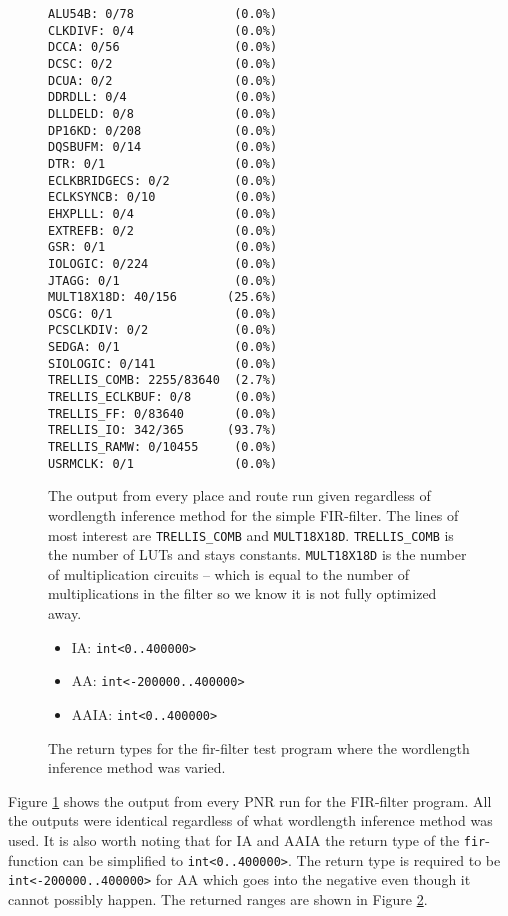 \begin{figure}[h!]
\begin{center}
\begin{verbatim}
ALU54B: 0/78              (0.0%)
CLKDIVF: 0/4              (0.0%)
DCCA: 0/56                (0.0%)
DCSC: 0/2                 (0.0%)
DCUA: 0/2                 (0.0%)
DDRDLL: 0/4               (0.0%)
DLLDELD: 0/8              (0.0%)
DP16KD: 0/208             (0.0%)
DQSBUFM: 0/14             (0.0%)
DTR: 0/1                  (0.0%)
ECLKBRIDGECS: 0/2         (0.0%)
ECLKSYNCB: 0/10           (0.0%)
EHXPLLL: 0/4              (0.0%)
EXTREFB: 0/2              (0.0%)
GSR: 0/1                  (0.0%)
IOLOGIC: 0/224            (0.0%)
JTAGG: 0/1                (0.0%)
MULT18X18D: 40/156       (25.6%)
OSCG: 0/1                 (0.0%)
PCSCLKDIV: 0/2            (0.0%)
SEDGA: 0/1                (0.0%)
SIOLOGIC: 0/141           (0.0%)
TRELLIS_COMB: 2255/83640  (2.7%)
TRELLIS_ECLKBUF: 0/8      (0.0%)
TRELLIS_FF: 0/83640       (0.0%)
TRELLIS_IO: 342/365      (93.7%)
TRELLIS_RAMW: 0/10455     (0.0%)
USRMCLK: 0/1              (0.0%)
\end{verbatim}
\end{center}

  \cprotect\caption{The output from every place and route run given regardless of wordlength inference method for the simple FIR-filter. The lines of most interest are \verb+TRELLIS_COMB+ and \verb+MULT18X18D+. \verb+TRELLIS_COMB+ is the number of LUTs and stays constants. \verb+MULT18X18D+ is the number of multiplication circuits -- which is equal to the number of multiplications in the filter so we know it is not fully optimized away.}
  \label{fig:FIRoutput}
\end{figure}

\begin{figure}[h!]
\begin{itemize}
  \item IA: \verb+int<0..400000>+
  \item AA: \verb+int<-200000..400000>+
  \item AAIA: \verb+int<0..400000>+
\end{itemize}
  \caption{The return types for the fir-filter test program where the wordlength inference method was varied.}
  \label{figRangeRes}
\end{figure}

Figure \ref{fig:FIRoutput} shows the output from every PNR run for the FIR-filter program. All the outputs were identical regardless of what wordlength inference method was used. It is also worth noting that for IA and AAIA the return type of the \verb+fir+-function can be simplified to \verb+int<0..400000>+. The return type is required to be \verb+int<-200000..400000>+ for AA which goes into the negative even though it cannot possibly happen. The returned ranges are shown in Figure \ref{figRangeRes}.

